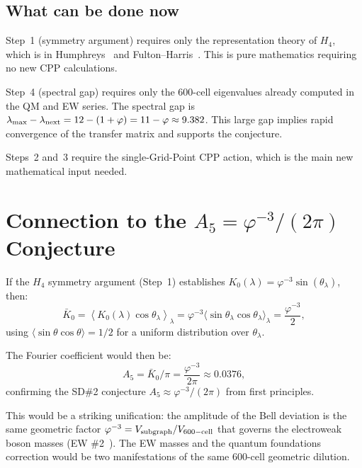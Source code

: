 \documentclass[11pt,a4paper]{article}
\newcommand{\phig}{\varphi}
\begin{document}
\subsection{What can be done now}

Step~1 (symmetry argument) requires only the representation theory
of $H_4$, which is in Humphreys~\citep{humphreys1990} and
Fulton--Harris~\citep{fulton1991}.  This is pure mathematics
requiring no new CPP calculations.

Step~4 (spectral gap) requires only the 600-cell eigenvalues
already computed in the QM and EW series.  The spectral gap is
$\lambda_{\rm max} - \lambda_{\rm next} = 12 - (1+\phig) =
11 - \phig \approx 9.382$.  This large gap implies rapid
convergence of the transfer matrix and supports the conjecture.

Steps~2 and~3 require the single-Grid-Point CPP action, which is
the main new mathematical input needed.

\section{Connection to the $A_5 = \phig^{-3}/(2\pi)$ Conjecture}

If the $H_4$ symmetry argument (Step~1) establishes
$K_0(\lambda) = \phig^{-3} \sin(\theta_\lambda)$, then:
\begin{equation}
\bar K_0
= \left\langle K_0(\lambda)\cos\theta_\lambda \right\rangle_\lambda
= \phig^{-3} \langle\sin\theta_\lambda\cos\theta_\lambda\rangle_\lambda
= \frac{\phig^{-3}}{2},
\label{eq:K0bar_if}
\end{equation}
using $\langle\sin\theta\cos\theta\rangle = 1/2$ for a uniform
distribution over $\theta_\lambda$.

The Fourier coefficient would then be:
\begin{equation}
A_5 = \bar K_0 / \pi = \frac{\phig^{-3}}{2\pi} \approx 0.0376,
\label{eq:A5_from_K0}
\end{equation}
confirming the SD\#2 conjecture $A_5 \approx \phig^{-3}/(2\pi)$
from first principles.

This would be a striking unification: the amplitude of the Bell
deviation is the same geometric factor $\phig^{-3} = V_{\rm
subgraph}/V_{\rm 600-cell}$ that governs the electroweak boson
masses (EW \#2~\citep{cpp_ew2}).  The EW masses and the quantum
foundations correction would be two manifestations of the same
600-cell geometric dilution.
\end{document}
